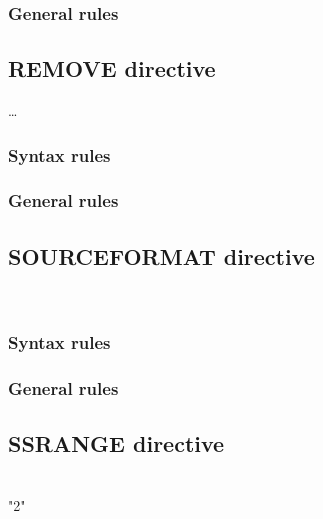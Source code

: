 \subsubsection{General rules}

\subsection{REMOVE directive}

\begin{syntax}[\miscextcolour]
   \literal \dots
\end{syntax}

\subsubsection{Syntax rules}

\subsubsection{General rules}

\subsection{SOURCEFORMAT directive}

\begin{syntax}[\miscextcolour]
  \begin{1=}
     \\
  \end{1=}
  \literal
\end{syntax}

\subsubsection{Syntax rules}

\subsubsection{General rules}

\subsection{SSRANGE directive}

\begin{syntax}[\miscextcolour]
  \begin{1=}
    \begin{0-1}
       \\
      "2" \\
    \end{0-1} \\

     \\
  \end{1=}
\end{syntax}

